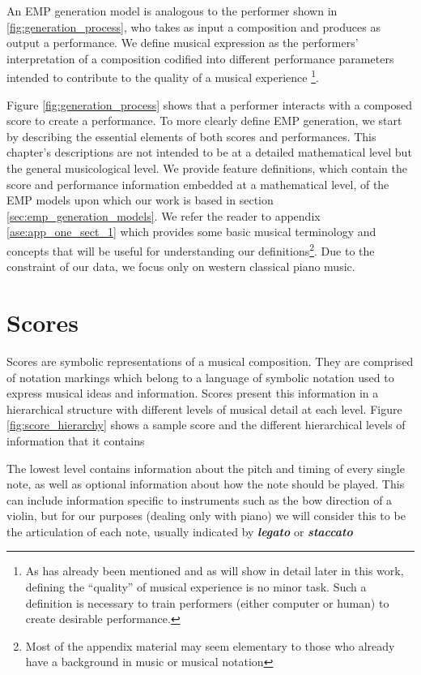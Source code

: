 An EMP generation model is analogous to the performer shown in \ref{fig:generation_process}, who takes as input a composition and produces as output a performance. We define musical expression as the performers' interpretation of a composition codified into different performance parameters intended to contribute to the quality of a musical experience%
\footnote{As has already been mentioned and as will show in detail later in this work, defining the ``quality'' of musical experience is no minor task. Such a definition is necessary to train performers (either computer or human) to create desirable performance.}. 

Figure \ref{fig:generation_process} shows that a performer interacts with a composed score to create a performance. To more clearly define EMP generation, we start by describing the essential elements of both scores and performances. This chapter's descriptions are not intended to be at a detailed mathematical level but the general musicological level. We provide feature definitions, which contain the score and performance information embedded at a mathematical level, of the EMP models upon which our work is based in section \ref{sec:emp_generation_models}. We refer the reader to appendix \ref{ase:app_one_sect_1} which provides some basic musical terminology and concepts that will be useful for understanding our definitions\footnote{Most of the appendix material may seem elementary to those who already have a background in music or musical notation}. Due to the constraint of our data, we focus only on western classical piano music. 

\section{Scores}\label{sec:scores}
Scores are symbolic representations of a musical composition. They are comprised of notation markings which belong to a language of symbolic notation used to express musical ideas and information. Scores present this information in a hierarchical structure with different levels of musical detail at each level. Figure \ref{fig:score_hierarchy} shows a sample score and the different hierarchical levels of information that it contains

\newcommand{\mnot}[1]{\textbf{\emph{#1}}}

The lowest level contains information about the pitch and timing of every single note, as well as optional information about how the note should be played. This can include information specific to instruments such as the bow direction of a violin, but for our purposes (dealing only with piano) we will consider this to be the articulation of each note, usually indicated by \mnot{legato} or \mnot{staccato} 

